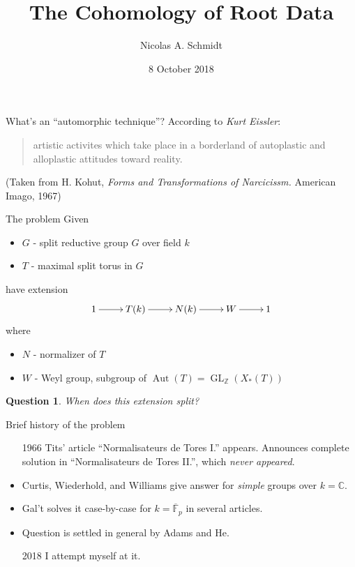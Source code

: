 \documentclass[pdf]{beamer}
\title{The Cohomology of Root Data}
\author{Nicolas A. Schmidt}
\date{8 October 2018}
\newcommand{\op}[1]{\operatorname{#1}}
\newcommand{\bbf}[1]{\mathds{#1}}
\newcommand{\Z}{\bbf{Z}}
\newcommand{\F}{\bbf{F}}
\newcommand{\C}{\bbf{C}}
\newtheorem{question}{Question}
\begin{document}
\begin{frame}
   \titlepage
\end{frame}

\begin{frame}{What's an ``automorphic technique''?}
   \pause
   According to \textit{Kurt Eissler}:
  \pause
   \blockquote[]{
       artistic activites which take place in a borderland of autoplastic and alloplastic attitudes toward reality.
   }
   (Taken from H. Kohut, \textit{Forms and Transformations of Narcicissm.} American Imago, 1967)
\end{frame}

\begin{frame}{The problem}
   \pause{}Given
   \begin{itemize}
      \item $G$ - split reductive group $G$ over field $k$\pause
      \item $T$ - maximal split torus in $G$
   \end{itemize}
   \pause have extension
   \[ \xymatrix{ 1 \ar[r] & T(k) \ar[r] & N(k) \ar[r] & W \ar[r] & 1 } \]
   \pause where
   \begin{itemize}
      \item $N$ - normalizer of $T$\pause
      \item $W$ - Weyl group\pause{}, subgroup of $\op{Aut}(T) = \op{GL}_{\Z}(X_\ast(T))$
   \end{itemize}\pause
   \begin{question}
      When does this extension split?
   \end{question}
\end{frame}

\begin{frame}{Brief history of the problem}
   \begin{itemize}
      \item[1966] Tits' article ``Normalisateurs de Tores I.'' appears. \pause Announces complete solution in ``Normalisateurs de Tores II.''\pause , which \textit{never appeared}.\pause 
      \item<-7>[1974] Curtis, Wiederhold, and Williams give answer for \textit{simple} groups over $k = \C$.\pause
      \item<-7>[2013--17] Gal't solves it case-by-case for $k = \overline{\F}_p$ in several articles.\pause
      \item<-7>[2017] Question is settled in general by Adams and He.\pause
      \item[2018] I attempt myself at it.\pause
   \end{itemize}
\end{frame}
\end{document}

